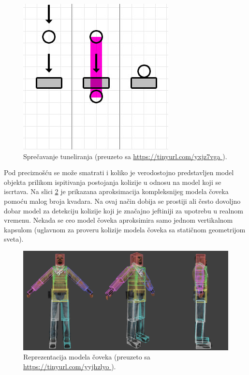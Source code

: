 \documentclass[12pt,oneside]{memoir}
\begin{document}
\begin{figure}[h!]
	\centering
	\includegraphics[scale=0.55]{tunnel_fixed.png}
	\caption{Sprečavanje tuneliranja (preuzeto sa \url{ https://tinyurl.com/yxjz7vga }).}
	
	\label{fig:tunnel_fix}
\end{figure}

Pod preciznošću se može smatrati i koliko je verodostojno predstavljen model objekta prilikom ispitivanja postojanja kolizije u odnosu 
na model koji se iscrtava.
Na slici \ref{fig:hitbox} je prikazana aproksimacija kompleksnijeg modela čoveka pomoću malog broja kvadara.
Na ovaj način dobija se prostiji ali često dovoljno dobar model za detekciju kolizije koji je značajno 
jeftiniji za upotrebu u realnom vremenu. 
Nekada se ceo model čoveka aproksimira samo jednom vertikalnom kapsulom
(uglavnom za proveru kolizije modela čoveka sa statičnom geometrijom sveta). 

\begin{figure}[h!]
	\centering
	\includegraphics[scale=0.55]{hitbox.png}
	\caption{Reprezentacija modela čoveka (preuzeto sa \url{ https://tinyurl.com/yyjhzlyo }).}
	
	\label{fig:hitbox}
\end{figure}
\end{document}
